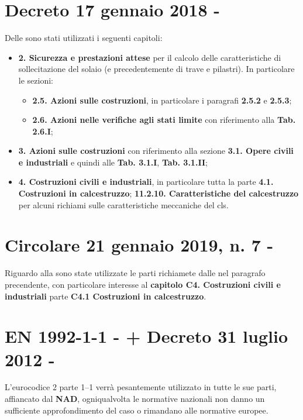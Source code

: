 \section{Decreto 17 gennaio 2018 - \ntc}
Delle \ntc sono stati utilizzati i seguenti capitoli:
\begin{itemize}
	\item \textbf{2. Sicurezza e prestazioni attese} per il calcolo delle caratteristiche di sollecitazione del solaio (e precedentemente di trave e pilastri). In particolare le sezioni:
	\begin{itemize}
		\item \textbf{2.5. Azioni sulle costruzioni}, in particolare i paragrafi \textbf{2.5.2} e \textbf{2.5.3};
		\item \textbf{2.6. Azioni nelle verifiche agli stati limite} con riferimento alla \textbf{Tab. 2.6.I};
	\end{itemize}
	\item \textbf{3. Azioni sulle costruzioni} con  riferimento alla sezione \textbf{3.1. Opere civili e industriali} e quindi alle \textbf{Tab. 3.1.I}, \textbf{Tab. 3.1.II};
	\item \textbf{4. Costruzioni civili e industriali}, in particolare tutta la parte \textbf{4.1. Costruzioni in calcestruzzo};
	\textbf{11.2.10. Caratteristiche del calcestruzzo} per alcuni richiami sulle caratteristiche meccaniche del cls.
\end{itemize}

\section{Circolare 21 gennaio 2019, n. 7 - \circolare}
Riguardo alla \circolare sono state utilizzate le parti richiamete dalle \ntc nel paragrafo precendente, con particolare interesse al \textbf{capitolo C4. Costruzioni civili e industriali} parte \textbf{C4.1 Costruzioni in calcestruzzo}.

\section{EN 1992-1-1 - \ec + Decreto 31 luglio 2012 - \nad}
L'eurocodice 2 parte 1--1 verrà pesantemente utilizzato in tutte le sue parti, affiancato dal \textbf{NAD}, ogniqualvolta le normative nazionali non danno un sufficiente approfondimento del caso o rimandano alle normative europee.

\cleardoublepage

